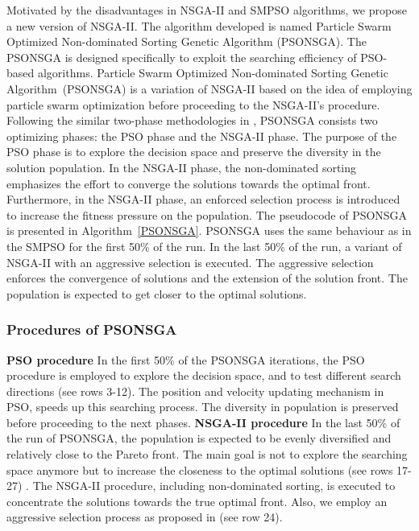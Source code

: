\documentclass[10pt,journal,compsoc]{IEEEtran}
\begin{document}
Motivated by the disadvantages in NSGA-II and SMPSO algorithms, we propose a new version of NSGA-II. The algorithm developed is named Particle Swarm Optimized Non-dominated Sorting Genetic Algorithm (PSONSGA). The PSONSGA is designed specifically to exploit the searching efficiency of PSO-based algorithms.
Particle Swarm Optimized Non-dominated Sorting Genetic Algorithm~(PSONSGA) is a variation of NSGA-II based on the idea of employing particle swarm optimization before proceeding to the NSGA-II's procedure. Following the similar two-phase methodologies in \cite{magnier2008multiobjective,onut2008two,sabri2000multi}, PSONSGA consists two optimizing phases: the PSO phase and the NSGA-II phase. The purpose of the PSO phase is to explore the decision space and preserve the diversity in the solution population. In the NSGA-II phase, the non-dominated sorting emphasizes the effort to converge the solutions towards the optimal front. Furthermore, in the NSGA-II phase, an enforced selection process is introduced to increase the fitness pressure on the population.
The pseudocode of PSONSGA is presented in Algorithm~\ref{PSONSGA}. 
PSONSGA uses the same behaviour as in the SMPSO for the first 50\% of the run. In the last 50\% of the run, a variant of NSGA-II with an aggressive selection is executed.
The aggressive selection enforces the convergence of solutions and the extension of the solution front. The population is expected to get closer to the optimal solutions.
 \subsubsection{Procedures of PSONSGA}
\textbf{PSO procedure}
In the first 50\% of the PSONSGA iterations, the PSO procedure is employed to explore the decision space, and to test different search directions (see rows 3-12). The position and velocity updating mechanism in PSO, speeds up this searching process. The diversity in population is preserved before proceeding to the next phases. 
\textbf{NSGA-II procedure}
In the last 50\% of the run of PSONSGA, the population is expected to be evenly diversified and relatively close to the Pareto front. The main goal is not to explore the searching space anymore but to increase the closeness to the optimal solutions (see rows 17-27) \cite{concordia}. The NSGA-II procedure, including non-dominated sorting, is executed to concentrate the solutions towards the true optimal front. Also, we employ an aggressive selection process as proposed in \cite{concordia} (see row 24).
\end{document}
